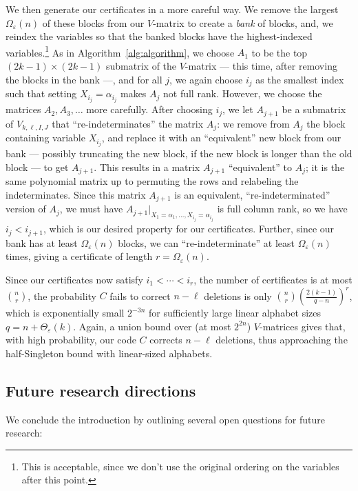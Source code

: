 \documentclass[11pt]{article}
\theoremstyle{plain}
\theoremstyle{definition}
\theoremstyle{remark}
\begin{document}
We then generate our certificates in a more careful way.
We remove the largest $\Omega_\varepsilon(n)$ of these blocks from our $V$-matrix to create a \emph{bank} of blocks, and, we reindex the variables so that the banked blocks have the highest-indexed variables.\footnote{This is acceptable, since we don't use the original ordering on the variables after this point.}
As in Algorithm~\ref{alg:algorithm}, we choose $A_1$ to be the top $(2k-1)\times (2k-1)$ submatrix of the $V$-matrix --- this time, after removing the blocks in the bank ---, and for all $j$, we again choose $i_j$ as the smallest index such that setting $X_{i_j}=\alpha_{i_j}$ makes $A_j$ not full rank.
However, we choose the matrices $A_2,A_3,\dots$ more carefully.
After choosing $i_j$, we let $A_{j+1}$ be a submatrix of $V_{k,\ell,I,J}$ that ``re-indeterminates'' the matrix $A_j$: we remove from $A_j$ the block containing variable $X_{i_j}$, and replace it with an ``equivalent'' new block from our bank --- possibly truncating the new block, if the new block is longer than the old block --- to get $A_{j+1}$. This results in a matrix $A_{j+1}$ ``equivalent'' to $A_j$; it is the same polynomial matrix up to permuting the rows and relabeling the indeterminates.
Since this matrix $A_{j+1}$ is an equivalent, ``re-indeterminated'' version of $A_j$, we must have $A_{j+1}|_{X_1=\alpha_1,\dots,X_{i_j}=\alpha_{i_j}}$ is full column rank, so we have $i_j < i_{j+1}$, which is our desired property for our certificates. Further, since our bank has at least $\Omega_\varepsilon(n)$ blocks, we can ``re-indeterminate'' at least $\Omega_\varepsilon(n)$ times, giving a certificate of length $r=\Omega_\varepsilon(n)$. 


Since our certificates now satisfy $i_1<\cdots<i_r$, the number of certificates is at most $\binom{n}{r}$, the probability $C$ fails to correct $n-\ell$ deletions is only $\binom{n}{r}\left(\frac{2(k-1)}{q-n}\right)^r$, which is exponentially small $2^{-3n}$ for sufficiently large linear alphabet sizes $q=n+\Theta_\varepsilon(k)$.
Again, a union bound over (at most $2^{2n}$) $V$-matrices gives that, with high probability, our code $C$ corrects $n-\ell$ deletions, thus approaching the half-Singleton bound with linear-sized alphabets.


\subsection{Future research directions}

We conclude the introduction by outlining several open questions for future research:
\end{document}
